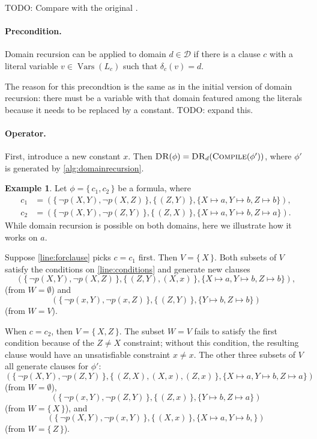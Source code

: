 \documentclass{article}
\theoremstyle{definition}
\newtheorem{example}{Example}
\theoremstyle{remark}
\DeclareMathOperator{\Compile}{\textsc{Compile}}
\DeclareMathOperator{\DR}{\textsc{DR}}
\DeclareMathOperator{\Vars}{Vars}
\begin{document}
TODO: Compare with the original \cite{DBLP:conf/nips/Broeck11}.

\paragraph{Precondition.} Domain recursion can be applied to domain $d \in \mathcal{D}$ if there is a clause $c$ with a literal variable $v \in \Vars(L_c)$ such that $\delta_c(v) = d$.

The reason for this precondtion is the same as in the initial version of domain recursion: there must be a variable with that domain featured among the literals because it needs to be replaced by a constant. TODO: expand this.

\paragraph{Operator.} First, introduce a new constant $x$. Then $\DR(\phi) = \DR_d(\Compile(\phi'))$, where $\phi'$ is generated by \cref{alg:domainrecursion}.

\begin{example}
  Let $\phi = \{\, c_1, c_2 \,\}$ be a formula, where
  \begin{align*}
    c_1 &= (\{\, \neg p(X, Y), \neg p(X, Z) \,\}, \{\, (Z, Y) \,\}, \{ X \mapsto a, Y \mapsto b, Z \mapsto b \}), \\
    c_2 &= (\{\, \neg p(X, Y), \neg p(Z, Y) \,\}, \{\, (Z, X) \,\}, \{ X \mapsto a, Y \mapsto b, Z \mapsto a \}).
  \end{align*}
  While domain recursion is possible on both domains, here we illustrate how it works on $a$.

  Suppose \cref{line:forclause} picks $c = c_1$ first. Then $V = \{\, X \,\}$. Both subsets of $V$ satisfy the conditions on \cref{line:conditions} and generate new clauses
  \[
  (\{\, \neg p(X, Y), \neg p(X, Z) \,\}, \{\, (Z, Y), (X, x) \,\}, \{ X \mapsto a, Y \mapsto b, Z \mapsto b \}),
  \]
  (from $W = \emptyset$) and
  \[
  (\{\, \neg p(x, Y), \neg p(x, Z) \,\}, \{\, (Z, Y) \,\}, \{ Y \mapsto b, Z \mapsto b \})
  \]
  (from $W = V$).

  When $c = c_2$, then $V = \{\, X, Z \,\}$. The subset $W = V$ fails to satisfy the first condition because of the $Z \ne X$ constraint; without this condition, the resulting clause would have an unsatisfiable constraint $x \ne x$. The other three subsets of $V$ all generate clauses for $\phi'$:
  \[
  (\{\, \neg p(X, Y), \neg p(Z, Y) \,\}, \{\, (Z, X), (X, x), (Z, x) \,\}, \{ X \mapsto a, Y \mapsto b, Z \mapsto a \})
  \]
  (from $W = \emptyset$),
  \[
  (\{\, \neg p(x, Y), \neg p(Z, Y) \,\}, \{\, (Z, x) \,\}, \{ Y \mapsto b, Z \mapsto a \})
  \]
  (from $W = \{\, X \,\}$), and
  \[
  (\{\, \neg p(X, Y), \neg p(x, Y) \,\}, \{\, (X, x) \,\}, \{ X \mapsto a, Y \mapsto b, \})
  \]
  (from $W = \{\, Z \,\}$).
\end{example}
\end{document}
